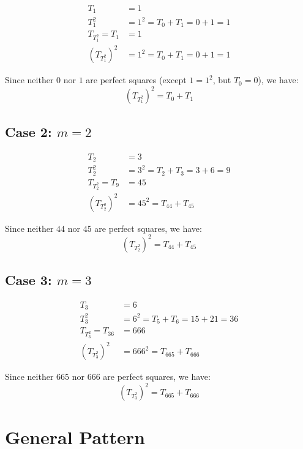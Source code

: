 \documentclass{article}
\begin{document}
\begin{align}
T_1 &= 1 \\
T_1^2 &= 1^2 = T_0 + T_1 = 0 + 1 = 1 \\
T_{T_1^2} = T_1 &= 1 \\
(T_{T_1^2})^2 &= 1^2 = T_0 + T_1 = 0 + 1 = 1
\end{align}

Since neither $0$ nor $1$ are perfect squares (except $1 = 1^2$, but $T_0 = 0$), we have:
\begin{equation}
(T_{T_1^2})^2 = T_0 + T_1
\end{equation}

\subsection{Case 2: $m = 2$}

\begin{align}
T_2 &= 3 \\
T_2^2 &= 3^2 = T_2 + T_3 = 3 + 6 = 9 \\
T_{T_2^2} = T_9 &= 45 \\
(T_{T_2^2})^2 &= 45^2 = T_{44} + T_{45}
\end{align}

Since neither $44$ nor $45$ are perfect squares, we have:
\begin{equation}
(T_{T_2^2})^2 = T_{44} + T_{45}
\end{equation}

\subsection{Case 3: $m = 3$}

\begin{align}
T_3 &= 6 \\
T_3^2 &= 6^2 = T_5 + T_6 = 15 + 21 = 36 \\
T_{T_3^2} = T_{36} &= 666 \\
(T_{T_3^2})^2 &= 666^2 = T_{665} + T_{666}
\end{align}

Since neither $665$ nor $666$ are perfect squares, we have:
\begin{equation}
(T_{T_3^2})^2 = T_{665} + T_{666}
\end{equation}

\section{General Pattern}
\end{document}
